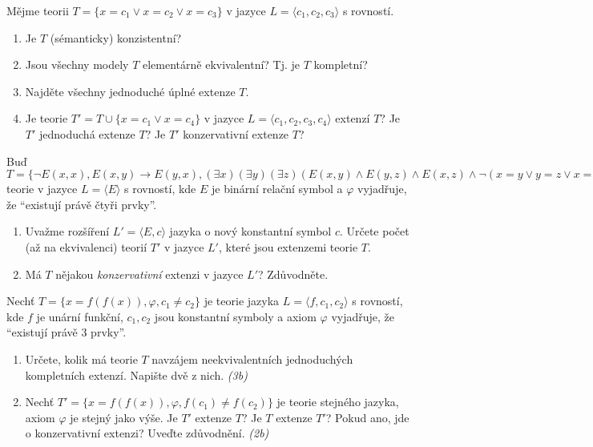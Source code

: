 \documentclass[a4paper,12pt]{article}
\begin{document}
\medskip\begin{problem}
    Mějme teorii $T=\{x=c_1 \vee x=c_2 \vee x=c_3\}$ v jazyce $L=\langle c_1,c_2,c_3\rangle$ s rovností.
    \begin{enumerate}        
        \item Je $T$ (sémanticky) konzistentní?
        \item Jsou všechny modely $T$ elementárně ekvivalentní? Tj. je $T$ kompletní?
        \item Najděte všechny jednoduché úplné extenze $T$.
        \item Je teorie $T'=T\cup\{x=c_1 \vee x=c_4\}$ v jazyce $L=\langle c_1,c_2,c_3,c_4\rangle$ extenzí $T$? Je $T'$ jednoduchá extenze $T$? Je $T'$ konzervativní extenze $T$?
    \end{enumerate}
\end{problem}


\medskip\begin{problem}
Buď $T=\{\neg E(x,x), E(x,y)\to E(y,x), (\exists x)(\exists y)(\exists z)(E(x,y)\wedge E(y,z)\wedge E(x,z)\wedge \neg(x=y\vee y=z\vee x=z)),\varphi\}$ teorie v jazyce $L=\langle E\rangle$ s rovností, kde $E$ je binární relační symbol a $\varphi$ vyjadřuje, že ``existují právě čtyři prvky''.
\begin{enumerate}    
    \item Uvažme rozšíření $L'=\langle E,c\rangle$ jazyka o nový konstantní symbol $c$. Určete počet (až na ekvivalenci) teorií $T'$ v jazyce $L'$, které jsou extenzemi teorie $T$. 
    \item Má $T$ nějakou \emph{konzervativní} extenzi v jazyce $L'$? Zdůvodněte.
\end{enumerate}
\end{problem}


\medskip\begin{problem}
Nechť $T=\{x=f(f(x)),\varphi, c_1 \ne c_2\}$ je teorie jazyka $L=\langle f,c_1,c_2\rangle$ s rovností, kde $f$ je unární funkční, $c_1,c_2$ jsou konstantní symboly a axiom $\varphi$ vyjadřuje, že ``existují právě $3$ prvky''.
\begin{enumerate}    
    \item Určete, kolik má teorie $T$ navzájem neekvivalentních jednoduchých kompletních extenzí. Napište dvě z nich. {\it (3b)}
    \item Nechť $T'=\{x=f(f(x)),\varphi,f(c_1)\ne f(c_2)\}$ je teorie stejného jazyka, axiom $\varphi$ je stejný jako výše. Je $T'$ extenze $T$? Je $T$ extenze $T'$? Pokud ano, jde o konzervativní extenzi? Uveďte zdůvodnění. {\it (2b)}
\end{enumerate}
\end{problem}
\end{document}
